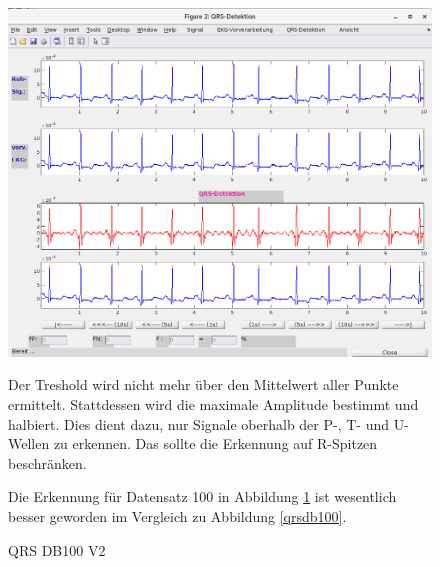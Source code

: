 \documentclass[a4paper,12pt,titlepage]{scrartcl}
\begin{document}
\begin{figure}[ht]
    \begin{minipage}[t]{0.5\linewidth}
        \centering
        \includegraphics[width=0.9\linewidth, valign=t]{Assets/LaborBMT-16-32-42.png}
        \caption{QRS DB100 V2}
        \label{qrsdb100v2}
    \end{minipage}%
    \begin{minipage}[t]{0.5\linewidth}
        Der Treshold wird nicht mehr über den Mittelwert aller Punkte ermittelt. Stattdessen wird die maximale Amplitude bestimmt und halbiert. Dies dient dazu, nur Signale oberhalb der P-, T- und U-Wellen zu erkennen. Das sollte die Erkennung auf R-Spitzen beschränken.

        Die Erkennung für Datensatz 100 in Abbildung \ref{qrsdb100v2} ist wesentlich besser geworden im Vergleich zu Abbildung \ref{qrsdb100}.
    \end{minipage}
\end{figure}
\end{document}
